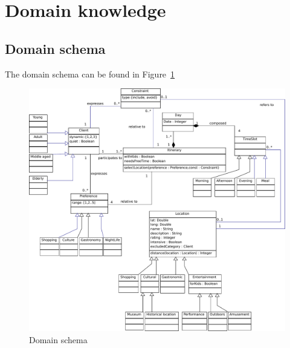 \documentclass[11pt]{article} %
\begin{document}
\section{Domain knowledge}


\subsection{Domain schema}
The domain schema can be found in Figure~\ref{fig:ClassDiagram}

\begin{figure}[h]
\centering
\includegraphics[width=\textwidth]{images/ClassDiagram.pdf}
\caption{Domain schema}
\label{fig:ClassDiagram}
\end{figure}
\end{document}
